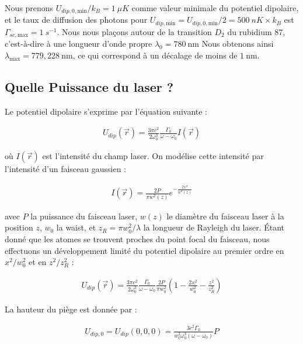 Nous prenons $U_{dip , 0 , \text{min}}/k_B = 1 ~\mu K$ comme valeur minimale du potentiel dipolaire, et le taux de diffusion des photons pour $U_{dip , \text{min}} = U_{dip , 0 , \text{min}}/2 = 500 ~nK \times k_B$ est $\Gamma_{sc , \text{max}} = 1~s^{-1}$. Nous nous plaçons autour de la transition $D_2$ du rubidium 87, c'est-à-dire à une {\color{red}longueur d'onde propre $\lambda_0 = 780 ~\text{nm}$} {\color{red} Nous obtenons ainsi $\lambda_{\text{max}} = 779,228 ~\text{nm}$, ce qui correspond à un décalage de moins de $1~\text{nm}$.}\\

\subsection{Quelle Puissance  du laser ?}

Le potentiel dipolaire s'exprime par l'équation suivante :

\begin{eqnarray}\label{eq:potentiel.dip.simple.classique}
	U_{dip}(\vec{r}) = \frac{3 \pi c^2}{2 \omega_0^3} \frac{\Gamma_0}{\omega - \omega_0} I(\vec{r})
\end{eqnarray}

où $I(\vec{r})$ est l'intensité du champ laser. On modélise cette intensité par l'intensité d'un faisceau gaussien :

\begin{eqnarray}
	I(\vec{r}) = \frac{2P}{\pi w^2(z)} e^{-\frac{2x^2}{w^2(z)}}
\end{eqnarray}

avec $P$ la puissance du faisceau laser, $w(z)$ le diamètre du faisceau laser à la position $z$, $w_0$ la waist, et $z_R = \pi w_0^2/\lambda$ la longueur de Rayleigh du laser. Étant donné que les atomes se trouvent proches du point focal du faisceau, nous effectuons un développement limité du potentiel dipolaire au premier ordre en $x^2/w_0^2$ et en $z^2/z_R^2$ :

\begin{eqnarray}
	U_{dip}(\vec{r}) = \frac{3 \pi c^2}{2 \omega_0^3} \frac{\Gamma_0}{\omega - \omega_0} \frac{2P}{\pi w_0^2} \left(1 - \frac{2x^2}{w_0^2} - \frac{z^2}{z_R^2}\right)
\end{eqnarray}

La hauteur du piège est donnée par :

\begin{eqnarray}
	U_{dip,0} = U_{dip}(0,0,0) = \frac{3c^2 \Gamma_0}{w_0^2 \omega_0^3 (\omega - \omega_0)} P
\end{eqnarray}

